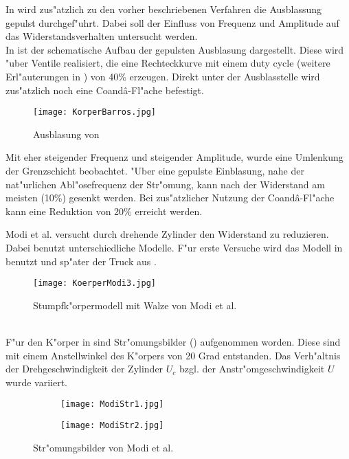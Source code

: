 In \cite{Barros.2016} wird zus"atzlich zu den vorher beschriebenen Verfahren die Ausblassung gepulst durchgef"uhrt. Dabei soll der Einfluss von Frequenz und Amplitude auf das Widerstandsverhalten untersucht werden.\\
In  ist der schematische Aufbau der gepulsten Ausblasung dargestellt. Diese wird "uber Ventile realisiert, die eine Rechteckkurve mit einem duty cycle (weitere Erl"auterungen in ) von 40\% erzeugen. Direkt unter der Ausblasstelle wird zus"atzlich noch eine Coand\^{a}-Fl"ache befestigt.\\
\begin{figure}[h]
	\centering
	\texttt{[image: KorperBarros.jpg]}
	\caption{Ausblasung von \cite{Barros.2016}}
	\label{fig:Barros}
\end{figure}
Mit eher steigender Frequenz und steigender Amplitude, wurde eine Umlenkung der Grenzschicht beobachtet. "Uber eine gepulste Einblasung, nahe der nat"urlichen Abl"osefrequenz der Str"omung, kann nach \cite{Barros.2016} der Widerstand am meisten (10\%) gesenkt werden. Bei zus"atzlicher Nutzung der Coand\^{a}-Fl"ache kann eine Reduktion von 20\% erreicht werden.

Modi et al. \cite{MODI.1991} versucht durch drehende Zylinder den Widerstand zu reduzieren. Dabei benutzt \cite{MODI.1991} unterschiedliche Modelle. F"ur erste Versuche wird das Modell in  benutzt und sp"ater der Truck aus .
\begin{figure}[h]
	\centering
	\texttt{[image: KoerperModi3.jpg]}
	\caption{Stumpfk"orpermodell mit Walze von Modi et al. \cite{MODI.1991}}
	\label{fig:Modi3}
\end{figure}\\
F"ur den K"orper in  sind Str"omungsbilder () aufgenommen worden. Diese sind mit einem Anstellwinkel des K"orpers von 20 Grad entstanden. Das Verh"altnis der Drehgeschwindigkeit der Zylinder \(U_c\) bzgl. der Anstr"omgeschwindigkeit \(U\) wurde variiert.\\
\begin{figure}[h]
	\centering
	\begin{subfigure}[c]{0.4\textwidth}		
		\texttt{[image: ModiStr1.jpg]}
	\end{subfigure}
	\begin{subfigure}[c]{0.4\textwidth}
		\texttt{[image: ModiStr2.jpg]}
	\end{subfigure}
	\caption{Str"omungsbilder von Modi et al. \cite{MODI.1991}}
	\label{fig:ModiStr}
\end{figure}

